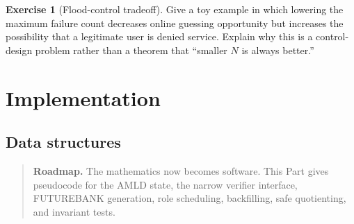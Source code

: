 \documentclass[11pt,openany]{book}
\theoremstyle{definition}
\newtheorem{exercise}[theorem]{Exercise}
\theoremstyle{remark}
\newenvironment{roadmap}{\begin{quote}\small\color{deepblue}\textbf{Roadmap.} }{\end{quote}}
\begin{document}
\begin{exercise}[Flood-control tradeoff]\label{ex:passworddos}
Give a toy example in which lowering the maximum failure count decreases online guessing opportunity but increases the possibility that a legitimate user is denied service. Explain why this is a control-design problem rather than a theorem that ``smaller $N$ is always better.''
\end{exercise}


\part{Implementation}

\chapter{Data structures}
\begin{roadmap}
The mathematics now becomes software. This Part gives pseudocode for the AMLD state, the narrow verifier interface, FUTUREBANK generation, role scheduling, backfilling, safe quotienting, and invariant tests.
\end{roadmap}
\end{document}
